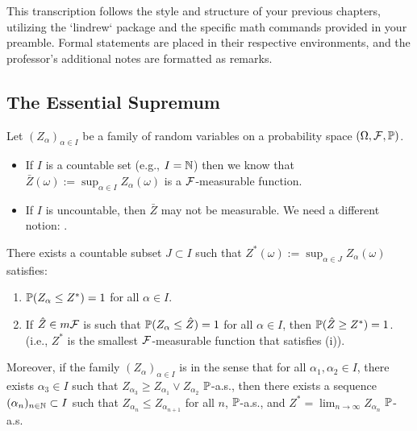 This transcription follows the style and structure of your previous chapters, utilizing the `lindrew` package and the specific math commands provided in your preamble. Formal statements are placed in their respective environments, and the professor's additional notes are formatted as remarks.

\subsection{The Essential Supremum}

\begin{remark}
    Let $(Z_\alpha)_{\alpha \in I}$ be a family of random variables on a probability space $(\Omega, \mathcal{F}, \mathbb P)$.
    \begin{itemize}
        \item If $I$ is a countable set (e.g., $I = \mathbb N$) then we know that $\bar{Z}(\omega) := \sup_{\alpha \in I} Z_\alpha(\omega)$ is a $\mathcal{F}$-measurable function.
        \item If $I$ is uncountable, then $\bar{Z}$ may not be measurable. We need a different notion: .
    \end{itemize}
\end{remark}

\begin{lemma}
    There exists a countable subset $J \subset I$ such that $Z^*(\omega) := \sup_{\alpha \in J} Z_\alpha(\omega)$ satisfies:
    \begin{enumerate}[label=(\roman*)]
        \item $\mathbb P(Z_\alpha \leq Z^*) = 1$ for all $\alpha \in I$.
        \item If $\hat{Z} \in m\mathcal{F}$ is such that $\mathbb P(Z_\alpha \leq \hat{Z}) = 1$ for all $\alpha \in I$, then $\mathbb P(\hat{Z} \geq Z^*) = 1$. (i.e., $Z^*$ is the smallest $\mathcal{F}$-measurable function that satisfies (i)).
    \end{enumerate}
    Moreover, if the family $(Z_\alpha)_{\alpha \in I}$ is  in the sense that for all $\alpha_1, \alpha_2 \in I$, there exists $\alpha_3 \in I$ such that $Z_{\alpha_3} \geq Z_{\alpha_1} \vee Z_{\alpha_2}$ $\mathbb P$-a.s., then there exists a sequence $(\alpha_n)_{n \in \mathbb N} \subset I$ such that $Z_{\alpha_n} \leq Z_{\alpha_{n+1}}$ for all $n$, $\mathbb P$-a.s., and $Z^* = \lim_{n \to \infty} Z_{\alpha_n}$ $\mathbb P$-a.s.
\end{lemma}

